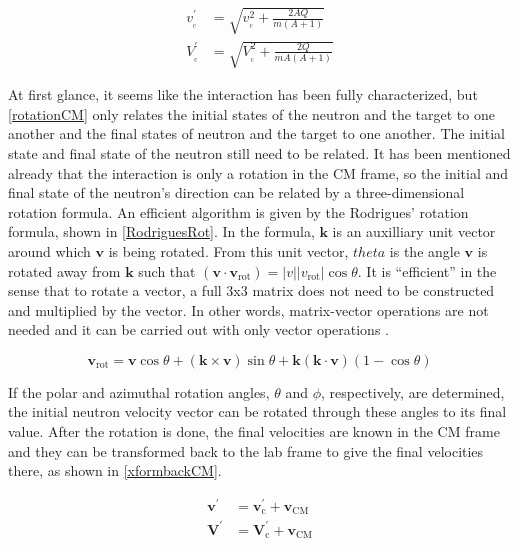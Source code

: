 \begin{equation}
\begin{split}
v_{_\mathrm{c}}^{\prime} &=  \sqrt{ v_{_\mathrm{c}}^{2} + \frac{2AQ}{m(A+1)}  }  \\
V_{_\mathrm{c}}^{\prime} &= \sqrt{ V_{_\mathrm{c}}^{2} + \frac{2Q}{mA(A+1)}  } 
\end{split}
\label{finalvCM}
\end{equation}

At first glance, it seems like the interaction has been fully characterized, but \eqref{rotationCM} only relates the initial states of the neutron and the target to one another and the final states of neutron and the target to one another.  The initial state and final state of the neutron still need to be related.  It has been mentioned already that the interaction is only a rotation in the CM frame, so the initial and final state of the neutron's direction can be related by a three-dimensional rotation formula.  An efficient algorithm is given by the Rodrigues' rotation formula, shown in \eqref{RodriguesRot}.  In the formula, $\boldsymbol{k}$ is an auxilliary unit vector around which $\boldsymbol{v}$ is being rotated.  From this unit vector, $theta$ is the angle $\boldsymbol{v}$ is rotated away from $\boldsymbol{k}$ such that $(\boldsymbol{v} \cdot \boldsymbol{v_{\mathrm{rot}}}) = |v||v_{\mathrm{rot}}|\cos\theta$.  It is ``efficient'' in the sense that to rotate a vector, a full 3x3 matrix does not need to be constructed and multiplied by the vector. In other words, matrix-vector operations are not needed and it can be carried out with only vector operations \cite{}.

\begin{equation}
 \boldsymbol{ v_{ \mathrm{rot}}} = \boldsymbol{v} \cos \theta + (\boldsymbol{k} \times \boldsymbol{v}) \sin \theta + \boldsymbol{k} (\boldsymbol{k} \cdot \boldsymbol{v})(1-\cos \theta)
\label{RodriguesRot}
\end{equation}

If the polar and azimuthal rotation angles, $\theta$ and $\phi$, respectively, are determined, the initial neutron velocity vector can be rotated through these angles to its final value.  After the rotation is done, the final velocities are known in the CM frame and they can be transformed back to the lab frame to give the final velocities there, as shown in \eqref{xformbackCM}.

\begin{equation}
\begin{split}
 \boldsymbol{v^{\prime}}  &= \boldsymbol{v_{\mathrm{c}}^{\prime}} + \boldsymbol{v_{\mathrm{CM}}} \\  
 \boldsymbol{V^{\prime}} &= \boldsymbol{V_{\mathrm{c}}^{\prime}} + \boldsymbol{v_{\mathrm{CM}}}
 \end{split}
\label{xformbackCM}
\end{equation}


